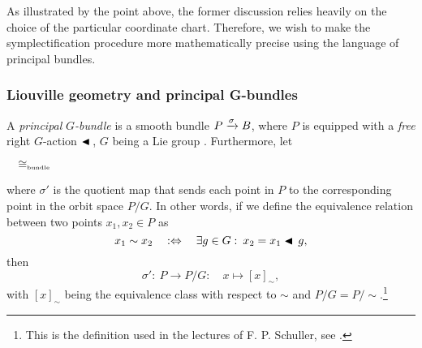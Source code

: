 As illustrated by the point above, the former discussion relies heavily on the choice of the particular coordinate chart. Therefore, we wish to make the symplectification procedure more mathematically precise using the language of principal bundles.

\subsubsection{Liouville geometry and principal G-bundles}
A \emph{principal} \(G\)\emph{-bundle} is a smooth bundle \(P\xrightarrow[]{\sigma}B\), where \(P\) is equipped with a \emph{free} right \(G\)-action \(\blacktriangleleft\,\), \(G\) being a Lie group \cite{Schuller2014}. Furthermore, let  
\begin{center}
    \(\quad \cong_\text{\tiny bundle} \quad \)
\end{center}
where \(\sigma'\) is the quotient map that sends each point in \(P\) to the corresponding point in the orbit space \(P/G\). In other words, if we define the equivalence relation between two points \(x_1, x_2 \in P\) as
\begin{equation}
     x_1 \sim x_2 \quad :\Leftrightarrow \quad \exists g \in G:\: x_2 = x_1 \blacktriangleleft\,g,
\end{equation}
then 
\begin{equation}
     \sigma':\: P \to P/G:\quad x \mapsto [x]_\sim,
\end{equation}
with \([x]_\sim\) being the equivalence class with respect to \(\sim\) and \(P/G = P/\sim\).\footnote{This is the definition used in the lectures of F. P. Schuller, see \cite{Schuller2014}.}

